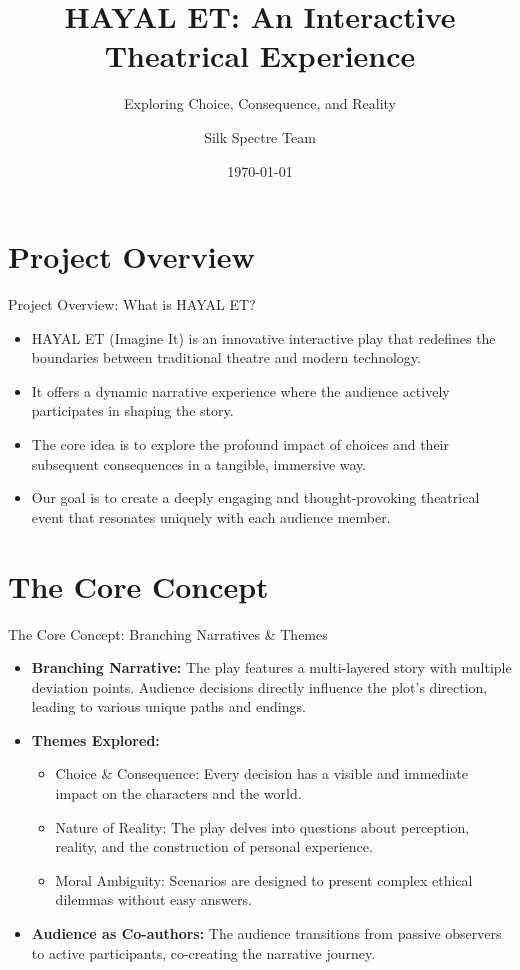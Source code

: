 \documentclass[aspectratio=169]{beamer}
\title{HAYAL ET: An Interactive Theatrical Experience}
\subtitle{Exploring Choice, Consequence, and Reality}
\author{Silk Spectre Team}
\institute{Interactive Play Project}
\date{\today}
\begin{document}
\frame{\titlepage}

\section{Project Overview}
\begin{frame}{Project Overview: What is HAYAL ET?}
    \begin{itemize}
        \item HAYAL ET (Imagine It) is an innovative interactive play that redefines the boundaries between traditional theatre and modern technology.
        \item It offers a dynamic narrative experience where the audience actively participates in shaping the story.
        \item The core idea is to explore the profound impact of choices and their subsequent consequences in a tangible, immersive way.
        \item Our goal is to create a deeply engaging and thought-provoking theatrical event that resonates uniquely with each audience member.
    \end{itemize}
\end{frame}

\section{The Core Concept}
\begin{frame}{The Core Concept: Branching Narratives & Themes}
    \begin{itemize}
        \item \textbf{Branching Narrative:} The play features a multi-layered story with multiple deviation points. Audience decisions directly influence the plot's direction, leading to various unique paths and endings.
        \item \textbf{Themes Explored:}
        \begin{itemize}
            \item Choice & Consequence: Every decision has a visible and immediate impact on the characters and the world.
            \item Nature of Reality: The play delves into questions about perception, reality, and the construction of personal experience.
            \item Moral Ambiguity: Scenarios are designed to present complex ethical dilemmas without easy answers.
        \end{itemize}
        \item \textbf{Audience as Co-authors:} The audience transitions from passive observers to active participants, co-creating the narrative journey.
    \end{itemize}
\end{frame}
\end{document}
